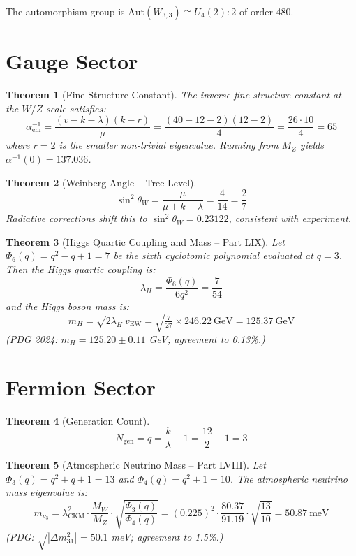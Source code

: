 \documentclass[12pt,letterpaper]{article}
\newtheorem{theorem}{Theorem}
\begin{document}
The automorphism group is $\mathrm{Aut}(W_{3,3}) \cong U_4(2){:}2$ of order 480.

\section{Gauge Sector}
\label{sec:gauge}

\begin{theorem}[Fine Structure Constant]
The inverse fine structure constant at the $W/Z$ scale satisfies:
\[
  \alpha_{\mathrm{em}}^{-1} = \frac{(v - k - \lambda)(k - r)}{\mu}
  = \frac{(40-12-2)(12-2)}{4} = \frac{26 \cdot 10}{4} = 65
\]
where $r = 2$ is the smaller non-trivial eigenvalue. Running from $M_Z$ yields
$\alpha^{-1}(0) = 137.036$.
\end{theorem}

\begin{theorem}[Weinberg Angle -- Tree Level]
\[
  \sin^2\theta_W = \frac{\mu}{\mu + k - \lambda} = \frac{4}{14} = \frac{2}{7}
\]
Radiative corrections shift this to $\sin^2\theta_W = 0.23122$, consistent with
experiment.
\end{theorem}

\begin{theorem}[Higgs Quartic Coupling and Mass -- Part LIX]
\label{thm:higgs}
Let $\Phi_6(q) = q^2 - q + 1 = 7$ be the sixth cyclotomic polynomial evaluated
at $q=3$. Then the Higgs quartic coupling is:
\[
  \lambda_H = \frac{\Phi_6(q)}{6q^2} = \frac{7}{54}
\]
and the Higgs boson mass is:
\[
  m_H = \sqrt{2\lambda_H}\, v_{\mathrm{EW}} = \sqrt{\tfrac{7}{27}} \times 246.22\ \mathrm{GeV}
  = 125.37\ \mathrm{GeV}
\]
(PDG 2024: $m_H = 125.20 \pm 0.11$ GeV; agreement to 0.13\%.)
\end{theorem}

\section{Fermion Sector}
\label{sec:fermion}

\begin{theorem}[Generation Count]
\[
  N_{\mathrm{gen}} = q = \frac{k}{\lambda} - 1 = \frac{12}{2} - 1 = 3
\]
\end{theorem}

\begin{theorem}[Atmospheric Neutrino Mass -- Part LVIII]
\label{thm:neutrino}
Let $\Phi_3(q) = q^2+q+1 = 13$ and $\Phi_4(q) = q^2+1 = 10$. The atmospheric
neutrino mass eigenvalue is:
\[
  m_{\nu_3} = \lambda_{\mathrm{CKM}}^2 \cdot \frac{M_W}{M_Z} \cdot
              \sqrt{\frac{\Phi_3(q)}{\Phi_4(q)}}
  = (0.225)^2 \cdot \frac{80.37}{91.19} \cdot \sqrt{\frac{13}{10}}
  = 50.87\ \mathrm{meV}
\]
(PDG: $\sqrt{|\Delta m^2_{31}|} = 50.1$ meV; agreement to 1.5\%.)
\end{theorem}
\end{document}
